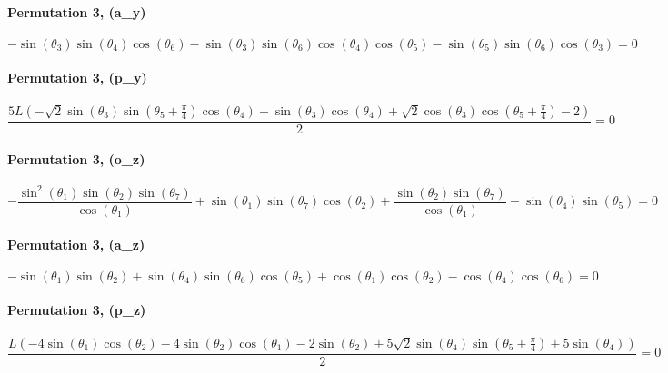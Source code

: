 \paragraph{Permutation 3, (a_{y})}
\begin{dmath*} - \sin{\left(\theta_{3} \right)} \sin{\left(\theta_{4} \right)} \cos{\left(\theta_{6} \right)} - \sin{\left(\theta_{3} \right)} \sin{\left(\theta_{6} \right)} \cos{\left(\theta_{4} \right)} \cos{\left(\theta_{5} \right)} - \sin{\left(\theta_{5} \right)} \sin{\left(\theta_{6} \right)} \cos{\left(\theta_{3} \right)} = 0 \end{dmath*}
\paragraph{Permutation 3, (p_{y})}
\begin{dmath*} \frac{5 L \left(- \sqrt{2} \sin{\left(\theta_{3} \right)} \sin{\left(\theta_{5} + \frac{\pi}{4} \right)} \cos{\left(\theta_{4} \right)} - \sin{\left(\theta_{3} \right)} \cos{\left(\theta_{4} \right)} + \sqrt{2} \cos{\left(\theta_{3} \right)} \cos{\left(\theta_{5} + \frac{\pi}{4} \right)} - 2\right)}{2} = 0 \end{dmath*}
\paragraph{Permutation 3, (o_{z})}
\begin{dmath*} - \frac{\sin^{2}{\left(\theta_{1} \right)} \sin{\left(\theta_{2} \right)} \sin{\left(\theta_{7} \right)}}{\cos{\left(\theta_{1} \right)}} + \sin{\left(\theta_{1} \right)} \sin{\left(\theta_{7} \right)} \cos{\left(\theta_{2} \right)} + \frac{\sin{\left(\theta_{2} \right)} \sin{\left(\theta_{7} \right)}}{\cos{\left(\theta_{1} \right)}} - \sin{\left(\theta_{4} \right)} \sin{\left(\theta_{5} \right)} = 0 \end{dmath*}
\paragraph{Permutation 3, (a_{z})}
\begin{dmath*} - \sin{\left(\theta_{1} \right)} \sin{\left(\theta_{2} \right)} + \sin{\left(\theta_{4} \right)} \sin{\left(\theta_{6} \right)} \cos{\left(\theta_{5} \right)} + \cos{\left(\theta_{1} \right)} \cos{\left(\theta_{2} \right)} - \cos{\left(\theta_{4} \right)} \cos{\left(\theta_{6} \right)} = 0 \end{dmath*}
\paragraph{Permutation 3, (p_{z})}
\begin{dmath*} \frac{L \left(- 4 \sin{\left(\theta_{1} \right)} \cos{\left(\theta_{2} \right)} - 4 \sin{\left(\theta_{2} \right)} \cos{\left(\theta_{1} \right)} - 2 \sin{\left(\theta_{2} \right)} + 5 \sqrt{2} \sin{\left(\theta_{4} \right)} \sin{\left(\theta_{5} + \frac{\pi}{4} \right)} + 5 \sin{\left(\theta_{4} \right)}\right)}{2} = 0 \end{dmath*}
